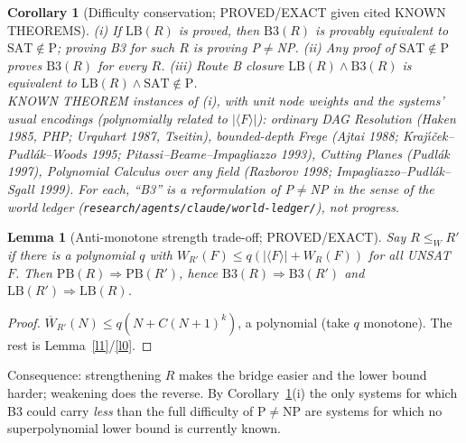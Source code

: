 \documentclass[11pt]{article}
\newtheorem{lemma}{Lemma}
\newtheorem{corollary}{Corollary}
\theoremstyle{definition}
\begin{document}
\begin{corollary}[Difficulty conservation; PROVED/EXACT given cited KNOWN THEOREMS]\label{c1}
(i) If $\mathrm{LB}(R)$ is proved, then $\mathrm{B3}(R)$ is provably \emph{equivalent} to
$\mathrm{SAT}\notin\mathrm P$; proving B3 for such $R$ \emph{is} proving P$\ne$NP.
(ii) Any proof of $\mathrm{SAT}\notin\mathrm P$ proves $\mathrm{B3}(R)$ for \emph{every} $R$.
(iii) Route B closure $\mathrm{LB}(R)\wedge\mathrm{B3}(R)$ is equivalent to
$\mathrm{LB}(R)\wedge\mathrm{SAT}\notin\mathrm P$.\\
KNOWN THEOREM instances of (i), with unit node weights and the systems' usual
encodings (polynomially related to $|\langle F\rangle|$): ordinary DAG Resolution
(Haken 1985, PHP; Urquhart 1987, Tseitin), bounded-depth Frege
(Ajtai 1988; Kraj\'\i\v{c}ek--Pudl\'ak--Woods 1995; Pitassi--Beame--Impagliazzo 1993),
Cutting Planes (Pudl\'ak 1997), Polynomial Calculus over any field
(Razborov 1998; Impagliazzo--Pudl\'ak--Sgall 1999). For each, ``B3'' is a
\emph{reformulation} of P$\ne$NP in the sense of the world ledger
(\texttt{research/agents/claude/world-ledger/}), not progress.
\end{corollary}

\begin{lemma}[Anti-monotone strength trade-off; PROVED/EXACT]\label{l3}
Say $R\le_W R'$ if there is a polynomial $q$ with $W_{R'}(F)\le q(|\langle F\rangle|+W_R(F))$
for all UNSAT $F$. Then $\mathrm{PB}(R)\Rightarrow\mathrm{PB}(R')$, hence
$\mathrm{B3}(R)\Rightarrow\mathrm{B3}(R')$ and $\mathrm{LB}(R')\Rightarrow\mathrm{LB}(R)$.
\end{lemma}
\begin{proof}
$\overline W_{R'}(N)\le q(N+C(N+1)^k)$, a polynomial (take $q$ monotone). The rest is Lemma~\ref{l1}/\ref{l0}.
\end{proof}
\noindent Consequence: strengthening $R$ makes the bridge easier and the lower bound
harder; weakening does the reverse. By Corollary~\ref{c1}(i) the only systems for
which B3 could carry \emph{less} than the full difficulty of P$\ne$NP are systems
for which no superpolynomial lower bound is currently known.
\end{document}
